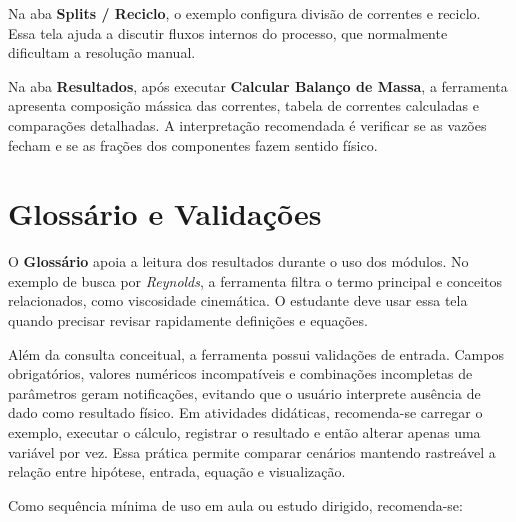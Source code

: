 
Na aba \textbf{Splits / Reciclo}, o exemplo configura divisão de correntes e reciclo. Essa tela ajuda a discutir fluxos internos do processo, que normalmente dificultam a resolução manual.


Na aba \textbf{Resultados}, após executar \textbf{Calcular Balanço de Massa}, a ferramenta apresenta composição mássica das correntes, tabela de correntes calculadas e comparações detalhadas. A interpretação recomendada é verificar se as vazões fecham e se as frações dos componentes fazem sentido físico.


\section{Glossário e Validações}

O \textbf{Glossário} apoia a leitura dos resultados durante o uso dos módulos. No exemplo de busca por \textit{Reynolds}, a ferramenta filtra o termo principal e conceitos relacionados, como viscosidade cinemática. O estudante deve usar essa tela quando precisar revisar rapidamente definições e equações.


Além da consulta conceitual, a ferramenta possui validações de entrada. Campos obrigatórios, valores numéricos incompatíveis e combinações incompletas de parâmetros geram notificações, evitando que o usuário interprete ausência de dado como resultado físico. Em atividades didáticas, recomenda-se carregar o exemplo, executar o cálculo, registrar o resultado e então alterar apenas uma variável por vez. Essa prática permite comparar cenários mantendo rastreável a relação entre hipótese, entrada, equação e visualização.

Como sequência mínima de uso em aula ou estudo dirigido, recomenda-se:

